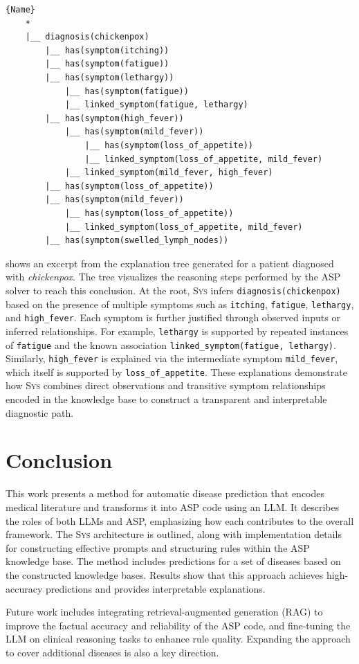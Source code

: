 \documentclass[10pt,leqno]{amsart}
\newcommand{\sys}{\textsc{Sys}\xspace}
\begin{document}
\begin{lstlisting}[caption={Excerpt from the explanation tree for the chickenpox diagnosis. The structure illustrates the reasoning path based on symptom associations.},
    label=lst:chickenpox_explanation]{Name}
    *
    |__ diagnosis(chickenpox)
        |__ has(symptom(itching))
        |__ has(symptom(fatigue))
        |__ has(symptom(lethargy))
            |__ has(symptom(fatigue))
            |__ linked_symptom(fatigue, lethargy)
        |__ has(symptom(high_fever))
            |__ has(symptom(mild_fever))
                |__ has(symptom(loss_of_appetite))
                |__ linked_symptom(loss_of_appetite, mild_fever)
            |__ linked_symptom(mild_fever, high_fever)
        |__ has(symptom(loss_of_appetite))
        |__ has(symptom(mild_fever))
            |__ has(symptom(loss_of_appetite))
            |__ linked_symptom(loss_of_appetite, mild_fever)
        |__ has(symptom(swelled_lymph_nodes))
\end{lstlisting}
    
 shows an excerpt from the explanation 
tree generated for a patient diagnosed with \textit{chickenpox}. 
The tree visualizes the reasoning steps performed by the ASP solver to reach this conclusion. 
At the root, \sys infers \texttt{diagnosis(chickenpox)} 
based on the presence of multiple symptoms such as \texttt{itching}, \texttt{fatigue}, \texttt{lethargy}, 
and \texttt{high\_fever}. 
Each symptom is further justified through observed inputs or inferred relationships. 
For example, \texttt{lethargy} is supported by repeated instances of \texttt{fatigue} 
and the known association \texttt{linked\_symptom(fatigue, lethargy)}. 
Similarly, \texttt{high\_fever} is explained via the intermediate symptom \texttt{mild\_fever}, 
which itself is supported by \texttt{loss\_of\_appetite}. 
These explanations demonstrate how \sys combines direct observations 
and transitive symptom relationships encoded in the knowledge base to 
construct a transparent and interpretable diagnostic path.

\section{Conclusion}

This work presents a method for automatic disease prediction 
that encodes medical literature and transforms it into ASP code using an LLM. 
It describes the roles of both LLMs and ASP, emphasizing how each contributes to the overall framework. 
The \sys architecture is outlined, along with implementation details for constructing effective prompts 
and structuring rules within the ASP knowledge base.
The method includes predictions for a set of diseases based on the constructed knowledge bases. 
Results show that this approach achieves high-accuracy predictions and provides interpretable explanations.

Future work includes integrating retrieval-augmented generation (RAG) to improve the factual accuracy 
and reliability of the ASP code, and fine-tuning the LLM on clinical reasoning tasks to enhance rule quality. 
Expanding the approach to cover additional diseases is also a key direction.
\newpage


\end{document}
